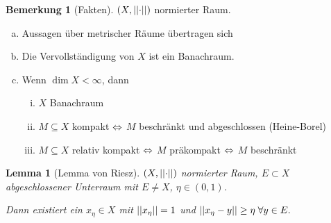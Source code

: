 \documentclass[ngerman]{report}
\theoremstyle{plain}%
\newtheorem{lemma}[thm]{Lemma}
\theoremstyle{definition}%
\theoremstyle{myStyle}
\newtheorem{bem}[thm]{Bemerkung}
\begin{document}
	\begin{bem}[Fakten]
		$(X,\left\lvert \left\lvert \cdot \right\rvert \right\rvert)$ normierter Raum.
		\begin{enumerate}[a)]
			\item Aussagen über metrischer Räume übertragen sich
			\item Die Vervollständigung von $X$ ist ein Banachraum.
			\item Wenn $\dim X < \infty$, dann
				\begin{enumerate}[i)]
					\item $X$ Banachraum
					\item $M\subseteq X$ kompakt $\overset{}{\Leftrightarrow}$ $M$ beschränkt und abgeschlossen (Heine-Borel)
					\item $M\subseteq X$ relativ kompakt $\overset{}{\Leftrightarrow}$ $M$ präkompakt  $\overset{}{\Leftrightarrow}$ $M$ beschränkt
				\end{enumerate}
		\end{enumerate}
	\end{bem}

	\begin{lemma}[Lemma von Riesz]%
		$(X,\left\lvert \left\lvert \cdot \right\rvert \right\rvert)$ normierter Raum, $E\subset X$ abgeschlossener Unterraum mit $E \not = X$, $\eta\in (0,1)$. \par
		Dann existiert ein $x_\eta \in X$ mit $\left\lvert \left\lvert x_\eta \right\rvert \right\rvert = 1$ und $\left\lvert \left\lvert x_\eta - y \right\rvert \right\rvert \geq \eta \; \forall y\in E.$
	\end{lemma}
\end{document}
